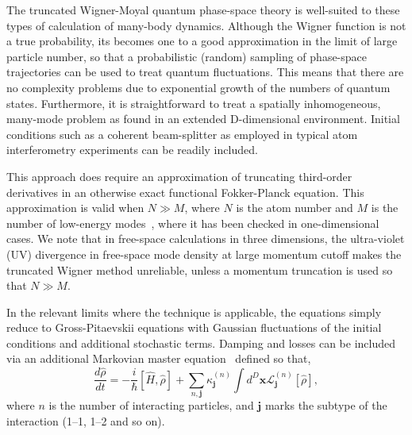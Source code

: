 \documentclass[aps,prl,twocolumn,showpacs,amsmath,amssymb,superscriptaddress]{revtex4-1}
\newcommand{\xvec}{\boldsymbol{x}}
\newcommand{\jvec}{\boldsymbol{j}}
\begin{document}
The truncated Wigner-Moyal quantum phase-space theory is well-suited
to these types of calculation of many-body dynamics.
Although the Wigner function is not a true probability,
its becomes one to a good approximation in the limit of large particle number,
so that a probabilistic (random) sampling of phase-space trajectories
can be used to treat quantum fluctuations.
This means that there are no complexity problems due to exponential growth
of the numbers of quantum states.
Furthermore, it is straightforward to treat a spatially inhomogeneous,
many-mode problem as found in an extended D-dimensional environment.
Initial conditions such as a coherent beam-splitter
as employed in typical atom interferometry experiments can be readily included.

This approach does require an approximation of truncating third-order derivatives
in an otherwise exact functional Fokker-Planck equation.
This approximation is valid when $N \gg M$, where $N$ is the atom number and
$M$ is the number of low-energy modes~\cite{Drummond1993,Sinatra2002,Norrie2006},
where it has been checked in one-dimensional cases.
We note that in free-space calculations in three dimensions,
the ultra-violet (UV) divergence in free-space mode density at large momentum cutoff
makes the truncated Wigner method unreliable,
unless a momentum truncation is used so that $N \gg M$.

In the relevant limits where the technique is applicable,
the equations simply reduce to Gross-Pitaevskii equations with Gaussian fluctuations
of the initial conditions and additional stochastic terms.
Damping and losses can be included via an additional Markovian master equation~\cite{Jack2002}
defined so that,
\begin{equation}
	\frac{d\hat{\rho}}{dt} = -\frac{i}{\hbar} \left[ \hat{H}, \hat{\rho} \right] +
	\sum_{n,\jvec} \kappa_{\jvec}^{(n)}
	\int d^D\xvec \mathcal{L}_{\jvec}^{(n)} \left[ \hat{\rho} \right],
\end{equation}
where $n$ is the number of interacting particles,
and $\jvec$ marks the subtype of the interaction (1--1, 1--2 and so on).
\end{document}
